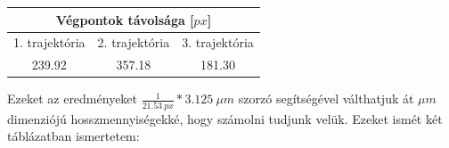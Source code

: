 \begin{center}
\label{tab:2}
\begin{tabular}{||c|c|c||}
    \toprule
    \multicolumn{3}{||c||}{Végpontok távolsága [$px$]} \\
    \hline
    1. trajektória  & 2. trajektória  & 3. trajektória \\ \hline \hline
    239.92          & 357.18          & 181.30         \\
    \bottomrule
\end{tabular}
\end{center}
\newpage

Ezeket az eredményeket $\frac{1}{21.53\ px} * 3.125\ \mu m$ szorzó segítségével válthatjuk át $\mu m$ dimenziójú hosszmennyiségekké, hogy számolni tudjunk velük. Ezeket ismét két táblázatban ismertetem:

